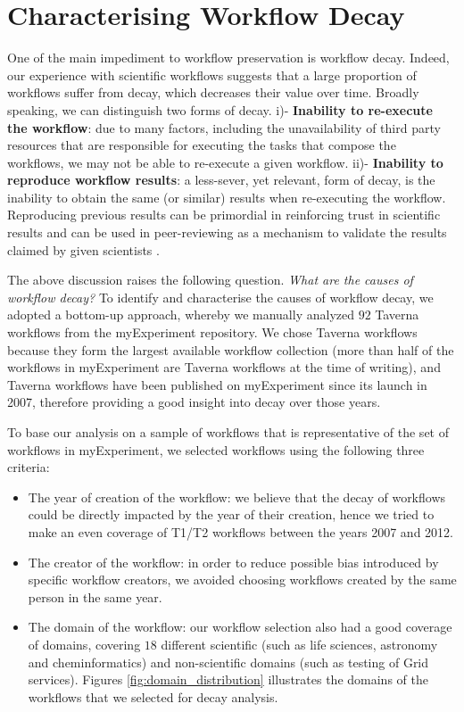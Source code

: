\section{Characterising Workflow Decay}
\label{sec:decay}

One of the main impediment to workflow preservation is workflow decay. Indeed, our experience with scientific workflows suggests that a large proportion of workflows suffer from decay, which decreases their value over time. Broadly speaking, we can distinguish two forms of decay. i)- {\bf Inability to re-execute the workflow}: due to many factors, including the unavailability of third party resources that are responsible for executing the tasks that compose the workflows, we may not be able to re-execute a given workflow. ii)- {\bf Inability to reproduce workflow results}: a less-sever, yet relevant, form of decay, is the inability to obtain the same (or similar) results when re-executing the workflow. Reproducing previous results can be primordial in reinforcing trust in scientific results and can be used in peer-reviewing as a mechanism to validate the results claimed by given scientists \cite{DBLP:journals/pvldb/FreireBS11,carole2011}. 

The above discussion raises the following question. {\em What are the causes of workflow decay?} To identify and characterise the causes of workflow decay, we adopted a bottom-up approach, whereby we manually analyzed $92$ Taverna workflows from the myExperiment repository. We chose Taverna workflows because they form the largest available workflow collection (more than half of the workflows in myExperiment are Taverna workflows at the time of writing), and Taverna workflows have been published on myExperiment since its launch in 2007, therefore providing a good insight into decay over those years. 

To base our analysis on a sample of workflows that is representative of the set of workflows in myExperiment, we selected workflows using the following three criteria: 
\begin{itemize}
\item
The year of creation of the workflow: we believe that the decay of workflows could be directly impacted by the year of their creation, hence we tried to make an even coverage of T1/T2 workflows between the years 2007 and 2012.
\item
The creator of the workflow:  in order to reduce possible bias introduced by specific workflow creators, we avoided choosing workflows created by the same person in the same year.
\item
The domain of the workflow: our workflow selection also had a good coverage of domains, covering $18$ different scientific (such as life sciences, astronomy and cheminformatics) and non-scientific domains (such as testing of Grid services).  Figures \ref{fig:domain_distribution} illustrates the domains of the workflows that we selected for decay analysis.
\end{itemize}
 

